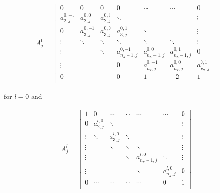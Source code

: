 \begin{multline}
  \label{eq:apx_diagonal}
  A^0_j = 
  \left[
    \begin{array}{ccccccc}
      0              & 0               & 0                & 0
      & \cdots           & \cdots           & 0                 \\
      a^{0,-1}_{2,j} & a^{0,0}_{2,j}    & a^{0,1}_{2,j}    & \ddots
      &                  &                  & \vdots            \\
      0              & a^{0,-1}_{3,j}   & a^{0,0}_{3,j}    & a^{0,1}_{3,j}
      & \ddots           &                  & \vdots            \\
      \vdots         & \ddots           & \ddots           & \ddots
      & \ddots           & \ddots           & \vdots            \\
      \vdots         &                  & \ddots           & a^{0,-1}_{n_{\mathrm{x}}-1,j}
      & a^{0,0}_{n_{\mathrm{x}}-1,j} & a^{0,1}_{n_{\mathrm{x}}-1,j} & 0                 \\
      \vdots         &                  &                  & 0
      & a^{0,-1}_{n_{\mathrm{x}},j}  & a^{0,0}_{n_{\mathrm{x}},j}   & a^{0,1}_{n_{\mathrm{x}},j}    \\
      0              & \cdots           & \cdots           & 0
      & 1                & -2               & 1                 \\
    \end{array}
  \right]
\end{multline}

\noindent for $l = 0$ and 

\begin{multline}
  \label{eq:apx_offdiagonal}
  A^l_j = 
  \left[
    \begin{array}{ccccccc}
      1               & 0                & \cdots           & \cdots
      & \cdots           & \cdots           & 0                 \\
      0               & a^{l,0}_{2,j}    & \ddots           &
      &                  &                  & \vdots            \\
      \vdots          & \ddots           & a^{l,0}_{3,j}    & \ddots
      &                  &                  & \vdots            \\
      \vdots          &                  & \ddots           & \ddots
      & \ddots           &                  & \vdots            \\
      \vdots          &                  &                  & \ddots
      & a^{l,0}_{n_{\mathrm{x}}-1,j} & \ddots           & \vdots            \\
      \vdots          &                  &                  &
      & \ddots           & a^{l,0}_{n_{\mathrm{x}},j}   & 0                 \\
      0               & \cdots           & \cdots           & \cdots  
      & \cdots           & 0                & 1                 \\
    \end{array}
  \right]
\end{multline}


